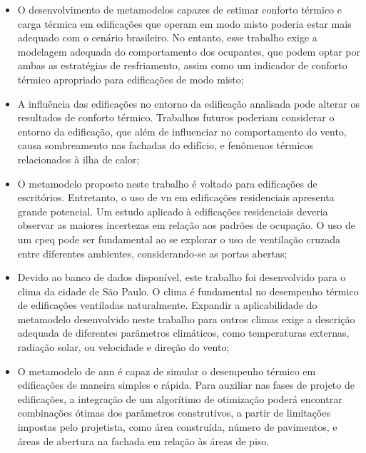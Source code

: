 \documentclass[brazil,hardcopy,openany]{ufscthesis} %
\begin{document}
\begin{itemize}
	\item O desenvolvimento de metamodelos capazes de estimar conforto térmico e carga térmica em edificações que operam em modo misto poderia estar mais adequado com o cenário brasileiro. No entanto, esse trabalho exige a modelagem adequada do comportamento dos ocupantes, que podem optar por ambas as estratégias de resfriamento, assim como um indicador de conforto térmico apropriado para edificações de modo misto;

	\item A influência das edificações no entorno da edificação analisada pode alterar os resultados de conforto térmico. Trabalhos futuros poderiam considerar o entorno da edificação, que além de influenciar no comportamento do vento, causa sombreamento nas fachadas do edifício, e fenômenos térmicos relacionados à ilha de calor;
	
	\item O metamodelo proposto neste trabalho é voltado para edificações de escritórios. Entretanto, o uso de \acrlong{vn} em edificações residenciais apresenta grande potencial. Um estudo aplicado à edificações residenciais deveria observar as maiores incertezas em relação aos padrões de ocupação. O uso de um \acrfull{cpeq} pode ser fundamental ao se explorar o uso de ventilação cruzada entre diferentes ambientes, considerando-se as portas abertas;

	\item Devido ao banco de dados disponível, este trabalho foi desenvolvido para o clima da cidade de São Paulo. O clima é fundamental no desempenho térmico de edificações ventiladas naturalmente. Expandir a aplicabilidade do metamodelo desenvolvido neste trabalho para outros climas exige a descrição adequada de diferentes parâmetros climáticos, como temperaturas externas, radiação solar, ou velocidade e direção do vento;
	

	\item O metamodelo de \acrshort{ann} é capaz de simular o desempenho térmico em edificações de maneira simples e rápida. Para auxiliar nas fases de projeto de edificações, a integração de um algorítimo de otimização poderá encontrar combinações ótimas dos parâmetros construtivos, a partir de limitações impostas pelo projetista, como área construída, número de pavimentos, e áreas de abertura na fachada em relação às áreas de piso.
	
\end{itemize}
\end{document}
